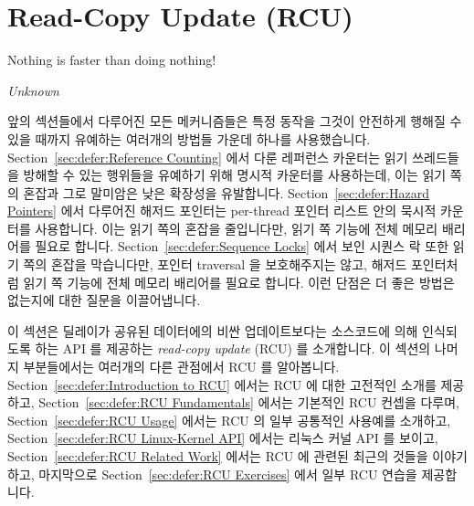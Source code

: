 
\section{Read-Copy Update (RCU)}
\label{sec:defer:Read-Copy Update (RCU)}
%
\epigraph{Nothing is faster than doing nothing!}{\emph{Unknown}}

앞의 섹션들에서 다루어진 모든 메커니즘들은 특정 동작을 그것이 안전하게 행해질
수 있을 때까지 유예하는 여러개의 방법들 가운데 하나를 사용했습니다.
Section~\ref{sec:defer:Reference Counting} 에서 다룬 레퍼런스 카운터는 읽기
쓰레드들을 방해할 수 있는 행위들을 유예하기 위해 명시적 카운터를 사용하는데,
이는 읽기 쪽의 혼잡과 그로 말미암은 낮은 확장성을 유발합니다.
Section~\ref{sec:defer:Hazard Pointers} 에서 다루어진 해저드 포인터는
per-thread 포인터 리스트 안의 묵시적 카운터를 사용합니다.
이는 읽기 쪽의 혼잡을 줄입니다만, 읽기 쪽 기능에 전체 메모리 배리어를 필요로
합니다.
Section~\ref{sec:defer:Sequence Locks} 에서 보인 시퀀스 락 또한 읽기 쪽의
혼잡을 막습니다만, 포인터 traversal 을 보호해주지는 않고, 해저드 포인터처럼
읽기 쪽 기능에 전체 메모리 배리어를 필요로 합니다.
이런 단점은 더 좋은 방법은 없는지에 대한 질문을 이끌어냅니다.
\iffalse

All of the mechanisms discussed in the preceding sections
used one of a number of approaches to defer specific actions
until they may be carried out safely.
The reference counters discussed in
Section~\ref{sec:defer:Reference Counting}
use explicit counters to defer actions that could disturb readers,
which results in read-side contention and thus poor scalability.
The hazard pointers covered by
Section~\ref{sec:defer:Hazard Pointers}
uses implicit counters in the guise of per-thread lists of pointer.
This avoids read-side contention, but requires
full memory barriers in read-side primitives.
The sequence lock presented in
Section~\ref{sec:defer:Sequence Locks}
also avoids read-side contention, but does not protect pointer
traversals and, like hazard pointers, requires full memory barriers
in read-side primitives.
These schemes' shortcomings raise the question of
whether it is possible to do better.
\fi

이 섹션은 딜레이가 공유된 데이터에의 비싼 업데이트보다는 소스코드에 의해
인식되도록 하는 API 를 제공하는 \emph{read-copy update} (RCU) 를 소개합니다.
이 섹션의 나머지 부분들에서는 여러개의 다른 관점에서 RCU 를 알아봅니다.
Section~\ref{sec:defer:Introduction to RCU} 에서는 RCU 에 대한 고전적인 소개를
제공하고,
Section~\ref{sec:defer:RCU Fundamentals} 에서는 기본적인 RCU 컨셉을 다루며,
Section~\ref{sec:defer:RCU Usage} 에서는 RCU 의 일부 공통적인 사용예를
소개하고,
Section~\ref{sec:defer:RCU Linux-Kernel API} 에서는 리눅스 커널 API 를 보이고,
Section~\ref{sec:defer:RCU Related Work} 에서는 RCU 에 관련된 최근의 것들을
이야기하고, 마지막으로
Section~\ref{sec:defer:RCU Exercises} 에서 일부 RCU 연습을 제공합니다.
\iffalse


